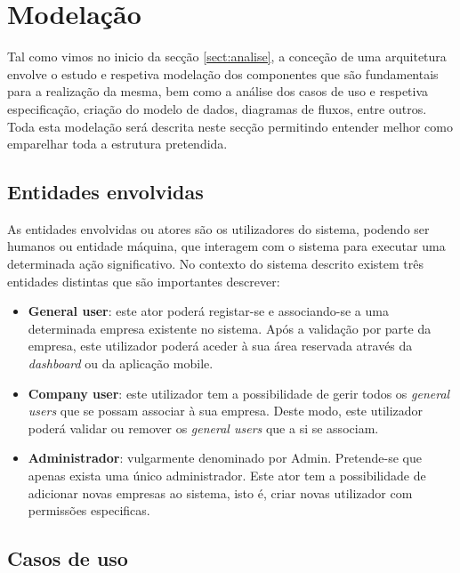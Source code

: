 \newpage
\section{Modelação}

Tal como vimos no inicio da secção \ref{sect:analise}, a conceção de uma arquitetura envolve o estudo e respetiva modelação dos componentes que são fundamentais para a realização da mesma, bem como a análise dos casos de uso e respetiva especificação, criação do modelo de dados, diagramas de fluxos, entre outros. Toda esta modelação será descrita neste secção permitindo entender melhor como emparelhar toda a estrutura pretendida. 



\subsection{Entidades envolvidas}

As entidades envolvidas ou atores são os utilizadores do sistema, podendo ser humanos ou entidade máquina, que interagem com o sistema para executar uma determinada ação significativo. No contexto do sistema descrito existem três entidades distintas que são importantes descrever: 

\begin{itemize}
	
	\item \textbf{General user}: este ator poderá registar-se e associando-se a uma determinada empresa existente no sistema. Após a validação por parte da empresa, este utilizador poderá aceder à sua área reservada através da \textit{dashboard} ou da aplicação mobile. 
	
	\item \textbf{Company user}: este utilizador tem a possibilidade de gerir todos os \textit{general users} que se possam associar à sua empresa. Deste modo, este utilizador poderá validar ou remover os \textit{general users} que a si se associam. 
	
	\item \textbf{Administrador}: vulgarmente denominado por Admin. Pretende-se que apenas exista uma único administrador. Este ator tem a possibilidade de adicionar novas empresas ao sistema, isto é, criar novas utilizador com permissões especificas. 
	
\end{itemize}




\subsection{Casos de uso}


